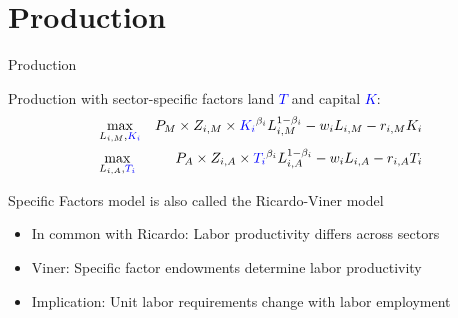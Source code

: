 \documentclass[notes,11pt, aspectratio=169, xcolor=table]{beamer}
\newcommand{\blue}[1]{\textcolor{blue}{#1}}
\newenvironment{wideitemize}{\itemize\addtolength{\itemsep}{10pt}}{\enditemize}
\begin{document}
\section{Production}

\begin{frame}{Production}

    \begin{wideitemize}

        \item<1-> Production with sector-specific factors land \blue{$T$} and capital \blue{$K$}:
        \begin{eqnarray*}\label{eq: production}
            &\max_{L_{i,M}, \blue{K_{i}}}& P_{M} \times  Z_{i,M} \times \blue{K_{i}}^{\beta_i} L_{i,M}^{1-\beta_i} - w_i L_{i,M} - r_{i,M} K_{i} \\
            &\max_{L_{i,A}, \blue{T_{i}}}& P_{A} \times  Z_{i,A} \times \blue{T_{i}}^{\beta_i} L_{i,A}^{1-\beta_i} - w_i L_{i,A} - r_{i,A} T_{i} 
        \end{eqnarray*}

        \item<2-> Specific Factors model is also called the Ricardo-Viner model \\
        \begin{itemize}
            \item<3-> In common with Ricardo: Labor productivity differs across sectors
            \item<4-> Viner: Specific factor endowments determine labor productivity
            \item<5-> Implication: Unit labor requirements change with labor employment
        \end{itemize}
    \end{wideitemize}
\end{frame}
\end{document}
